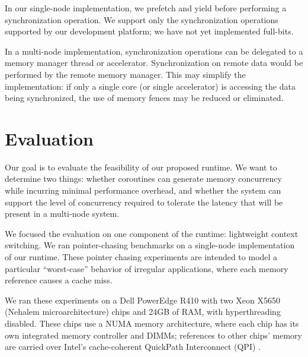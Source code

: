 \documentclass[10pt,nocopyrightspace]{sigplanconf}
\begin{document}
In our single-node implementation, we prefetch and yield before performing
a synchronization operation. We support only the synchronization
operations supported by our development platform; we have not yet
implemented full-bits.

In a multi-node implementation, synchronization operations can be delegated to a memory manager
thread or accelerator. Synchronization on remote data would be
performed by the remote memory manager. This may simplify the
implementation: if only a single core (or single accelerator) is
accessing the data being synchronized, the use of memory fences may be
reduced or eliminated.


\section{Evaluation}
\label{sec:evaluation}

Our goal is to evaluate the feasibility of our proposed runtime. We
want to determine two things: whether coroutines can generate memory
concurrency while incurring minimal performance overhead, and whether the system can support the level of concurrency required to tolerate the latency that will be present in a multi-node system.

We focused the evaluation on one component of the runtime: lightweight context switching. We ran pointer-chasing benchmarks on a single-node implementation of our runtime. These pointer chasing experiments are intended to model a particular ``worst-case'' behavior of irregular applications, where each memory reference causes a cache miss.

We ran these experiments on a Dell PowerEdge R410 with two Xeon X5650 (Nehalem microarchitecture)
chips and 24GB of RAM, with hyperthreading disabled. These
chips use a NUMA memory architecture, where each chip has
its own integrated memory controller and DIMMs; references to other
chips' memory are carried over Intel's cache-coherent QuickPath
Interconnect (QPI) \cite{quickpath:website}.
\end{document}
